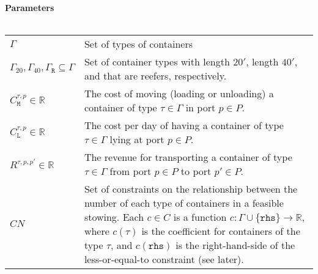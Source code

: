 \paragraph{Parameters}$\;$\\
%
%

\begin{tabular}{lp{}}
$\Gamma$&Set of types of containers\\
$\Gamma_{20}, \Gamma_{40}, \Gamma_{\texttt{R}}\subseteq \Gamma$&Set of container types with length $20'$, length $40'$, and that are reefers, respectively.\\
$C^{\tau,p}_{\texttt{M}} \in \mathbb{R}$&The cost of moving (loading or unloading) a container of type $\tau\in \Gamma$ in port $p\in P$.\\
$C^{\tau,p}_{\texttt{L}} \in \mathbb{R}$&The cost per day of having a container of type $\tau\in\Gamma$ lying at port $p\in P$.\\
$R^{\tau,p,p'}\in \mathbb{R}$&The revenue for transporting a container of type $\tau\in \Gamma$ from port $p\in P$ to port $p'\in P$.\\
$CN$&Set of constraints on the relationship between the number of each type of containers in a feasible stowing. Each $c\in C$ is a function $c:\Gamma\cup \{\texttt{rhs}\}\to\mathbb{R}$, where $c(\tau)$ is the coefficient for containers of the type $\tau$, and $c(\texttt{rhs})$ is the right-hand-side of the less-or-equal-to constraint (see later). 
\end{tabular}
